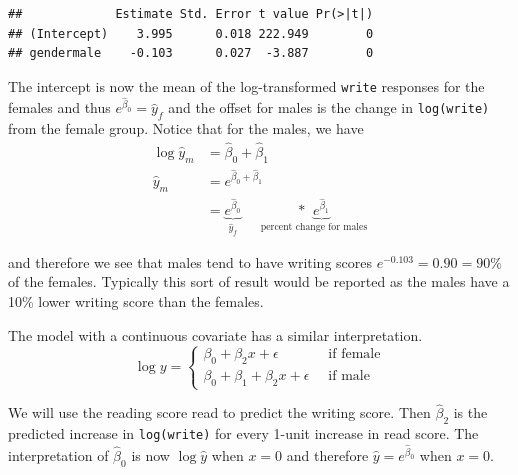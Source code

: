 \documentclass[]{book}
\newenvironment{Shaded}{\begin{snugshade}}{\end{snugshade}}
\newcommand{\KeywordTok}[1]{\textcolor[rgb]{0.13,0.29,0.53}{\textbf{{#1}}}}
\newcommand{\DataTypeTok}[1]{\textcolor[rgb]{0.13,0.29,0.53}{{#1}}}
\newcommand{\DecValTok}[1]{\textcolor[rgb]{0.00,0.00,0.81}{{#1}}}
\newcommand{\StringTok}[1]{\textcolor[rgb]{0.31,0.60,0.02}{{#1}}}
\newcommand{\CommentTok}[1]{\textcolor[rgb]{0.56,0.35,0.01}{\textit{{#1}}}}
\newcommand{\NormalTok}[1]{{#1}}
\theoremstyle{definition}
\theoremstyle{definition}
\theoremstyle{remark}
\begin{document}
\begin{verbatim}
##             Estimate Std. Error t value Pr(>|t|)
## (Intercept)    3.995      0.018 222.949        0
## gendermale    -0.103      0.027  -3.887        0
\end{verbatim}

The intercept is now the mean of the log-transformed \texttt{write}
responses for the females and thus \(e^{\hat{\beta}_0} = \hat{y}_{f}\)
and the offset for males is the change in \texttt{log(write)} from the
female group. Notice that for the males, we have \[\begin{aligned}
\log\hat{y}_m   &=  \hat{\beta}_{0}+\hat{\beta}_{1} \\
    \hat{y}_m   &=  e^{\hat{\beta}_{0}+\hat{\beta}_{1}} \\
              &=    \underset{\hat{y}_{f}}{\underbrace{e^{\hat{\beta}_{0}}}}\;\;\;\;\;\underset{\textrm{percent change for males}}{*\;\;\underbrace{e^{\hat{\beta}_{1}}}} 
\end{aligned}\]

and therefore we see that males tend to have writing scores
\(e^{-0.103}=0.90=90\%\) of the females. Typically this sort of result
would be reported as the males have a 10\% lower writing score than the
females.

The model with a continuous covariate has a similar interpretation.
\[\log y=\begin{cases}
\beta_{0}+\beta_{2}x+\epsilon & \;\;\textrm{if female}\\
\beta_{0}+\beta_{1}+\beta_{2}x+\epsilon & \;\;\textrm{if male}
\end{cases}\]

We will use the reading score read to predict the writing score. Then
\(\hat{\beta}_{2}\) is the predicted increase in \texttt{log(write)} for
every 1-unit increase in read score. The interpretation of
\(\hat{\beta}_{0}\) is now \(\log\hat{y}\) when \(x=0\) and therefore
\(\hat{y}=e^{\hat{\beta}_{0}}\) when \(x=0\).

\begin{Shaded}
\end{Shaded}
\end{document}
